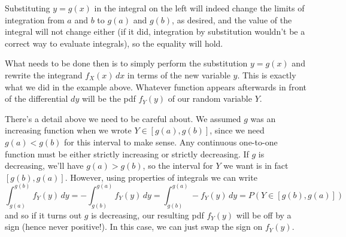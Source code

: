 Substituting $y = g(x)$ in the integral on the left will indeed change the limits of integration from $a$ and $b$ to $g(a)$ and $g(b)$, as desired, and the value of the integral will not change either (if it did, integration by substitution wouldn't be a correct way to evaluate integrals), so the equality will hold.
\par
What needs to be done then is to simply perform the substitution $y = g(x)$ and rewrite the integrand $f_X(x)\,dx$ in terms of the new variable $y$. This is exactly what we did in the example above. Whatever function appears afterwards in front of the differential $dy$ will be the pdf $f_Y(y)$ of our random variable $Y$.
\par
\rmk There's a detail above we need to be careful about. We assumed $g$ was an increasing function when we wrote $Y \in [g(a), g(b)]$, since we need $g(a) < g(b)$ for this interval to make sense. Any continuous one-to-one function must be either strictly increasing or strictly decreasing. If $g$ is decreasing, we'll have $g(a) > g(b)$, so the interval for $Y$ we want is in fact $[g(b), g(a)]$. However, using properties of integrals we can write
$$\int_{g(a)}^{g(b)} f_Y(y)\, dy = -\int_{g(b)}^{g(a)} f_Y(y)\, dy = \int_{g(b)}^{g(a)} -f_Y(y)\, dy = P(Y \in [g(b),g(a)])$$
and so if it turns out $g$ is decreasing, our resulting pdf $f_Y(y)$ will be off by a sign (hence never positive!). In this case, we can just swap the sign on $f_Y(y)$.
%
